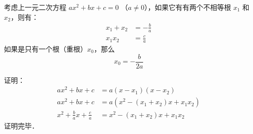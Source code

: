 
\begin{theorem}{}
考虑上一元二次方程 $a x^2 + b x + c = 0$ （$a \neq 0$），如果它有有两个不相等根 $x_1$ 和 $x_2$，则有：
$$\begin{aligned}
x_1 + x_2 &= -\frac{b}{a} \\
x_1 x_2 &= \frac{c}{a}
\end{aligned}$$
如果是只有一个根（重根）$x_0$，那么
$$
x_0 = - \frac{b}{2 a}
$$
\end{theorem}

证明：
$$\begin{aligned}
a x^2 + b x + c &= a (x - x_1) (x - x_2) \\
a x^2 + b x + c &= a (x^2 - (x_1 + x_2) x + x_1 x_2) \\
x^2 + \frac{b}{a} x + \frac{c}{a} &=  x^2 - (x_1 + x_2) x + x_1 x_2
\end{aligned}$$
证明完毕．